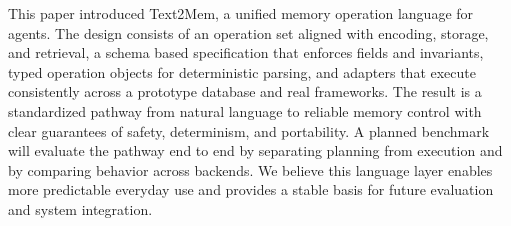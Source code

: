 \documentclass[conference]{IEEEtran}
\begin{document}
This paper introduced Text2Mem, a unified memory operation language for agents. The design consists of an operation set aligned with encoding, storage, and retrieval, a schema based specification that enforces fields and invariants, typed operation objects for deterministic parsing, and adapters that execute consistently across a prototype database and real frameworks. The result is a standardized pathway from natural language to reliable memory control with clear guarantees of safety, determinism, and portability. A planned benchmark will evaluate the pathway end to end by separating planning from execution and by comparing behavior across backends. We believe this language layer enables more predictable everyday use and provides a stable basis for future evaluation and system integration. 



\end{document}
